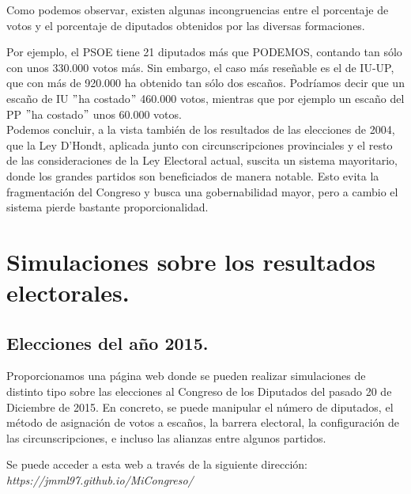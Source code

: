 \documentclass[11pt]{article}
\newcommand\console[1]{{\inconsolata #1}}
\begin{document}

	
		\enlargethispage{2\baselineskip}
	Como podemos observar, existen algunas incongruencias entre el porcentaje de votos y el porcentaje de diputados obtenidos por las diversas formaciones.
	
	Por ejemplo, el PSOE tiene 21 diputados más que PODEMOS, contando tan sólo con unos 330.000 votos más. Sin embargo, el caso más reseñable es el de IU-UP, que con más de 920.000 ha obtenido tan sólo dos escaños. Podríamos decir que un escaño de IU $"$ha costado$"$  460.000 votos, mientras que por ejemplo un escaño del PP $"$ha costado$"$ unos 60.000 votos.\\
	
	Podemos concluir, a la vista también de los resultados de las elecciones de 2004, que la Ley D'Hondt, aplicada junto con circunscripciones provinciales y el resto de las consideraciones de la Ley Electoral actual, suscita un sistema mayoritario, donde los grandes partidos son beneficiados de manera notable. Esto evita la fragmentación del Congreso y busca una gobernabilidad mayor, pero a cambio el sistema pierde bastante proporcionalidad.
	
	\newpage
	
	\section{Simulaciones sobre los resultados electorales.}
	\subsection{Elecciones del año 2015.}
	
	Proporcionamos una página web donde se pueden realizar simulaciones de distinto tipo sobre las elecciones al Congreso de los Diputados del pasado 20 de Diciembre de 2015. En concreto, se puede manipular el número de diputados, el método de asignación de votos a escaños, la barrera electoral, la configuración de las circunscripciones, e incluso las alianzas entre algunos partidos.
	
	Se puede acceder a esta web a través de la siguiente dirección:\\
	
	\vspace{-1em}
	\console{\textit{https://jmml97.github.io/MiCongreso/}}
	
\end{document}

